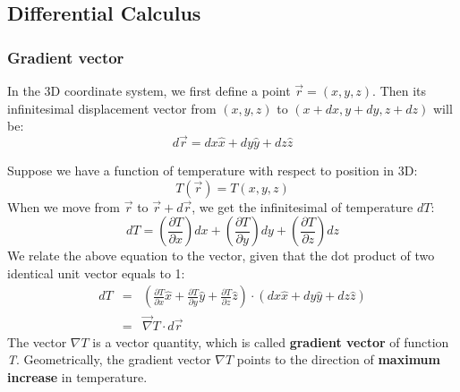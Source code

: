 \documentclass[12pt,a4paper,twoside]{article}
\begin{document}
	\subsection{Differential Calculus}
	\subsubsection{Gradient vector}
	In the 3D coordinate system, we first define a point \(\overrightarrow{r}=(x,y,z)\). Then its infinitesimal displacement vector from \((x,y,z)\) to \((x+dx, y+dy, z+dz)\) will be:
	\begin{equation}
		d\overrightarrow{r}=dx\hat{x}+dy\hat{y}+dz\hat{z}
	\end{equation}
	
	\noindent Suppose we have a function of temperature with respect to position in 3D:
	\[T(\overrightarrow{r})=T(x,y,z)\]
	When we move from \(\overrightarrow{r}\) to \(\overrightarrow{r}+d\overrightarrow{r}\), we get the infinitesimal of temperature \(dT\):
	\[dT=(\frac{\partial T}{\partial x})dx+(\frac{\partial T}{\partial y})dy+(\frac{\partial T}{\partial z})dz\]
	We relate the above equation to the vector, given that the dot product of two identical unit vector equals to 1:
	\begin{eqnarray*}
		dT &=& \left(\frac{\partial T}{\partial x}\hat x+\frac{\partial T}{\partial y}\hat y+\frac{\partial T}{\partial z}\hat z\right)\cdot (dx\hat x+ dy\hat y+dz\hat z)\\
		&=& \overrightarrow{\nabla} T \cdot d\overrightarrow{r}
	\end{eqnarray*}
	The vector \(\nabla T\) is a vector quantity, which is called \textbf{gradient vector} of function \textit{T}. Geometrically, the gradient vector \(\nabla T\) points to the direction of \textbf{maximum increase} in temperature.\\
	
\end{document}
